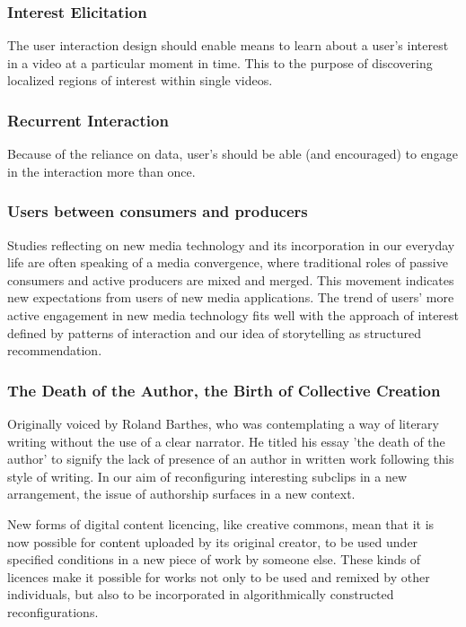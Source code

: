\subsubsection{Interest Elicitation}
The user interaction design should enable means to learn about a user's interest in a video at a particular moment in time. This to the purpose of discovering localized regions of interest within single videos.

\subsubsection{Recurrent Interaction}
Because of the reliance on data, user's should be able (and encouraged) to engage in the interaction more than once.

\subsubsection{Users between consumers and producers}
Studies reflecting on new media technology and its incorporation in our everyday life are often speaking of a media convergence, where traditional roles of passive consumers and active producers are mixed and merged. This movement indicates new expectations from users of new media applications. The trend of users' more active engagement in new media technology fits well with the approach of interest defined by patterns of interaction and our idea of storytelling as structured recommendation.

\subsubsection{The Death of the Author, the Birth of Collective Creation}
Originally voiced by Roland Barthes, who was contemplating a way of literary writing without the use of a clear narrator. He titled his essay 'the death of the author' to signify the lack of presence of an author in written work following this style of writing. In our aim of reconfiguring interesting subclips in a new arrangement, the issue of authorship surfaces in a new context. 

New forms of digital content licencing, like creative commons, mean that it is now possible for content uploaded by its original creator, to be used under specified conditions in a new piece of work by someone else. These kinds of licences make it possible for works not only to be used and remixed by other individuals, but also to be incorporated in algorithmically constructed reconfigurations. 

